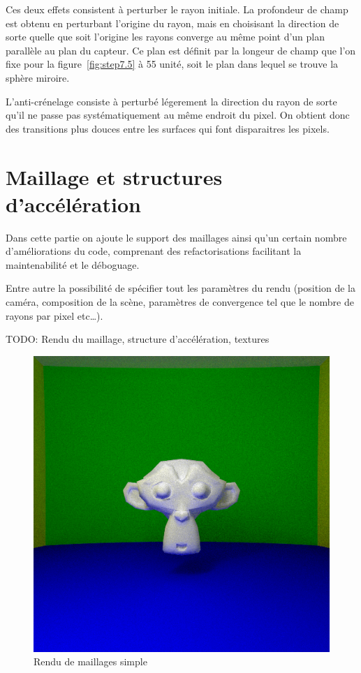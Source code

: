 \documentclass[12pt]{article}
\begin{document}
Ces deux effets consistent à perturber le rayon initiale.
La profondeur de champ est obtenu en perturbant l'origine du rayon, mais en choisisant la direction de sorte quelle que soit l'origine les rayons converge au même point d'un plan parallèle au plan du capteur.
Ce plan est définit par la longeur de champ que l'on fixe pour la figure~\ref{fig:step7.5} à 55 unité, soit le plan dans lequel se trouve la sphère miroire.

L'anti-crénelage consiste à perturbé légerement la direction du rayon de sorte qu'il ne passe pas systématiquement au même endroit du pixel.
On obtient donc des transitions plus douces entre les surfaces qui font disparaitres les pixels.

\section{Maillage et structures d'accélération\label{sec:mesh}}

Dans cette partie on ajoute le support des maillages ainsi qu'un certain nombre d'améliorations du code, comprenant des refactorisations facilitant la maintenabilité et le déboguage.

Entre autre la possibilité de spécifier tout les paramètres du rendu (position de la caméra, composition de la scène, paramètres de convergence tel que le nombre de rayons par pixel etc\ldots).

TODO: Rendu du maillage, structure d'accélération, textures

\begin{figure}[ht]
  \centering
  \includegraphics[width=12cm]{../result/step9}
  \caption{Rendu de maillages simple}\label{fig:step9}
\end{figure}
\end{document}

